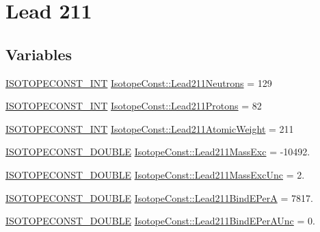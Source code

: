 \hypertarget{group___isotope_const-_lead-_pb211}{}\section{Lead 211}
\label{group___isotope_const-_lead-_pb211}
\subsection*{Variables}
\begin{DoxyCompactItemize}
\item 
\mbox{\hyperlink{group___isotope_const-_macros_ga5f18360b3e99483a35c32d789e62621c}{I\+S\+O\+T\+O\+P\+E\+C\+O\+N\+S\+T\+\_\+\+I\+NT}} \mbox{\hyperlink{group___isotope_const-_lead-_pb211_ga6ffd98cd069a2951a2377c730d1941cc}{Isotope\+Const\+::\+Lead211\+Neutrons}} = 129
\item 
\mbox{\hyperlink{group___isotope_const-_macros_ga5f18360b3e99483a35c32d789e62621c}{I\+S\+O\+T\+O\+P\+E\+C\+O\+N\+S\+T\+\_\+\+I\+NT}} \mbox{\hyperlink{group___isotope_const-_lead-_pb211_gae64b6ea7145562ec58363854b8c2dcf8}{Isotope\+Const\+::\+Lead211\+Protons}} = 82
\item 
\mbox{\hyperlink{group___isotope_const-_macros_ga5f18360b3e99483a35c32d789e62621c}{I\+S\+O\+T\+O\+P\+E\+C\+O\+N\+S\+T\+\_\+\+I\+NT}} \mbox{\hyperlink{group___isotope_const-_lead-_pb211_gae0bcf247364b4c5eb7ac9d0209ad4f38}{Isotope\+Const\+::\+Lead211\+Atomic\+Weight}} = 211
\item 
\mbox{\hyperlink{group___isotope_const-_macros_ga8f45a7272ce02c0b4c65c44636ed719a}{I\+S\+O\+T\+O\+P\+E\+C\+O\+N\+S\+T\+\_\+\+D\+O\+U\+B\+LE}} \mbox{\hyperlink{group___isotope_const-_lead-_pb211_ga9dc3e5d9cd61f43c4fab028da6054911}{Isotope\+Const\+::\+Lead211\+Mass\+Exc}} = -\/10492.
\item 
\mbox{\hyperlink{group___isotope_const-_macros_ga8f45a7272ce02c0b4c65c44636ed719a}{I\+S\+O\+T\+O\+P\+E\+C\+O\+N\+S\+T\+\_\+\+D\+O\+U\+B\+LE}} \mbox{\hyperlink{group___isotope_const-_lead-_pb211_ga31b7e4c3ec7356b968c5c309040479cf}{Isotope\+Const\+::\+Lead211\+Mass\+Exc\+Unc}} = 2.
\item 
\mbox{\hyperlink{group___isotope_const-_macros_ga8f45a7272ce02c0b4c65c44636ed719a}{I\+S\+O\+T\+O\+P\+E\+C\+O\+N\+S\+T\+\_\+\+D\+O\+U\+B\+LE}} \mbox{\hyperlink{group___isotope_const-_lead-_pb211_ga064090f337e1e67f24c48af5af76c6e1}{Isotope\+Const\+::\+Lead211\+Bind\+E\+PerA}} = 7817.
\item 
\mbox{\hyperlink{group___isotope_const-_macros_ga8f45a7272ce02c0b4c65c44636ed719a}{I\+S\+O\+T\+O\+P\+E\+C\+O\+N\+S\+T\+\_\+\+D\+O\+U\+B\+LE}} \mbox{\hyperlink{group___isotope_const-_lead-_pb211_gaeeccc621add578a625ed7d5f1f6b406e}{Isotope\+Const\+::\+Lead211\+Bind\+E\+Per\+A\+Unc}} = 0.

\end{DoxyCompactItemize}
